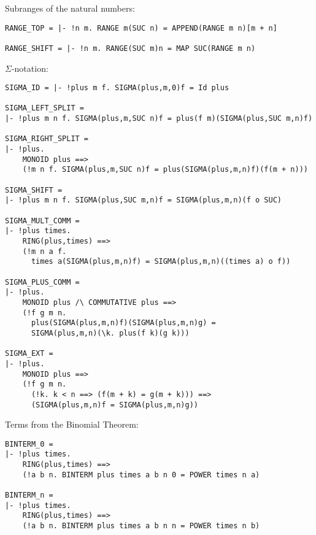 Subranges of the natural numbers:
\begin{session}
\begin{verbatim}
RANGE_TOP = |- !n m. RANGE m(SUC n) = APPEND(RANGE m n)[m + n]

RANGE_SHIFT = |- !n m. RANGE(SUC m)n = MAP SUC(RANGE m n)
\end{verbatim}
\end{session}

\newpage
$\Sigma$-notation:
\begin{session}
\begin{verbatim}
SIGMA_ID = |- !plus m f. SIGMA(plus,m,0)f = Id plus

SIGMA_LEFT_SPLIT = 
|- !plus m n f. SIGMA(plus,m,SUC n)f = plus(f m)(SIGMA(plus,SUC m,n)f)

SIGMA_RIGHT_SPLIT = 
|- !plus.
    MONOID plus ==>
    (!m n f. SIGMA(plus,m,SUC n)f = plus(SIGMA(plus,m,n)f)(f(m + n)))

SIGMA_SHIFT = 
|- !plus m n f. SIGMA(plus,SUC m,n)f = SIGMA(plus,m,n)(f o SUC)

SIGMA_MULT_COMM = 
|- !plus times.
    RING(plus,times) ==>
    (!m n a f.
      times a(SIGMA(plus,m,n)f) = SIGMA(plus,m,n)((times a) o f))

SIGMA_PLUS_COMM = 
|- !plus.
    MONOID plus /\ COMMUTATIVE plus ==>
    (!f g m n.
      plus(SIGMA(plus,m,n)f)(SIGMA(plus,m,n)g) =
      SIGMA(plus,m,n)(\k. plus(f k)(g k)))

SIGMA_EXT = 
|- !plus.
    MONOID plus ==>
    (!f g m n.
      (!k. k < n ==> (f(m + k) = g(m + k))) ==>
      (SIGMA(plus,m,n)f = SIGMA(plus,m,n)g))
\end{verbatim}
\end{session}

Terms from the Binomial Theorem:
\begin{session}
\begin{verbatim}
BINTERM_0 = 
|- !plus times.
    RING(plus,times) ==>
    (!a b n. BINTERM plus times a b n 0 = POWER times n a)

BINTERM_n = 
|- !plus times.
    RING(plus,times) ==>
    (!a b n. BINTERM plus times a b n n = POWER times n b)
\end{verbatim}
\end{session}
